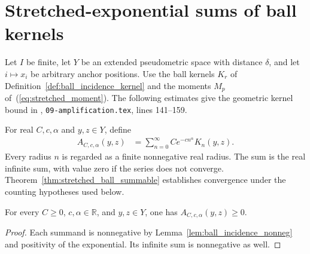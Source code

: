 \section{Stretched-exponential sums of ball kernels}
\label{sec:stretched_ball_kernel}

Let $I$ be finite, let $Y$ be an extended pseudometric space with
distance $\delta$, and let $i\mapsto x_i$ be arbitrary anchor
positions.  Use the ball kernels $K_r$ of
Definition~\ref{def:ball_incidence_kernel} and the moments $M_p$
of~(\ref{eq:stretched_moment}).
The following estimates give the geometric kernel bound in
\cite{OpenAI2026AreaLaw}, \texttt{09-amplification.tex},
lines 141--159.

\begin{definition}
    \label{def:stretched_ball_kernel}
    \leanok
    For real $C,c,\alpha$ and $y,z\in Y$, define
    \begin{align}
        A_{C,c,\alpha}(y,z)
         & =\sum_{n=0}^{\infty}C e^{-cn^\alpha}K_n(y,z).
        \label{eq:stretched_ball_kernel}
    \end{align}
    Every radius $n$ is regarded as a finite nonnegative real radius.
    The sum is the real infinite sum, with value zero if the series
    does not converge.  Theorem~\ref{thm:stretched_ball_summable}
    establishes convergence under the counting hypotheses used below.
\end{definition}

\begin{lemma}
    \label{lem:stretched_ball_nonneg}
    \leanok
    For every $C\geq0$, $c,\alpha\in\mathbb R$, and $y,z\in Y$,
    one has $A_{C,c,\alpha}(y,z)\geq0$.
\end{lemma}
\begin{proof}
    \leanok
    Each summand is nonnegative by
    Lemma~\ref{lem:ball_incidence_nonneg} and positivity of the
    exponential.  Its infinite sum is nonnegative as well.
\end{proof}

